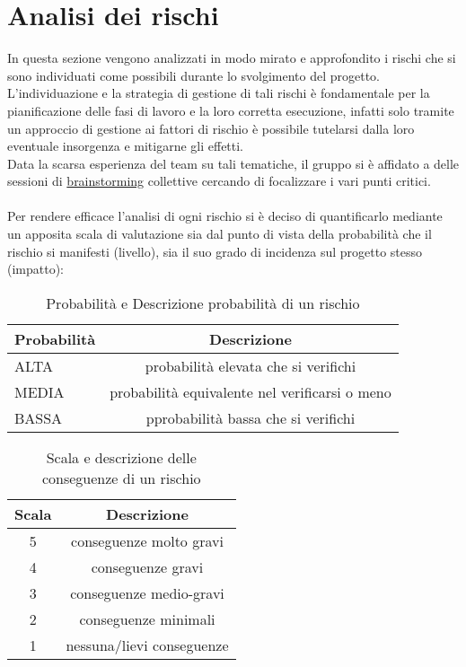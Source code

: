 \section{Analisi dei rischi}
In questa sezione vengono analizzati in modo mirato e approfondito i rischi che si sono individuati come possibili durante lo svolgimento del progetto. L'individuazione e la strategia di gestione di tali rischi è fondamentale per la pianificazione delle fasi di lavoro e la loro corretta esecuzione, infatti solo tramite un approccio di gestione ai fattori di rischio è possibile tutelarsi dalla loro eventuale insorgenza e mitigarne gli effetti.\\
Data la scarsa esperienza del team su tali tematiche, il gruppo si è affidato a delle sessioni di \underline{brainstorming} collettive cercando di focalizzare i vari punti critici. \\\\
Per rendere efficace l'analisi di ogni rischio si è deciso di quantificarlo mediante un apposita scala di valutazione sia dal punto di vista della probabilità che il rischio si manifesti (livello), sia il suo grado di incidenza sul progetto stesso (impatto):\\
\begin{table}[h!]
\centering
\begin{tabular}{|l|c|}
\hline
Probabilità& Descrizione\\
\hline
ALTA & probabilità elevata che si verifichi\\
MEDIA & probabilità equivalente nel verificarsi o meno\\
BASSA & pprobabilità bassa che si verifichi\\
\hline
\end{tabular}
\caption{Probabilità e Descrizione probabilità di un rischio}\label{tab:livellorischi}
\end{table}
\begin{table}[h!]
\centering
\begin{tabular}{|c|c|}
\hline
Scala& Descrizione  \\
\hline
5 & conseguenze molto gravi\\
4 & conseguenze gravi\\
3 & conseguenze medio-gravi\\
2 & conseguenze minimali\\
1 & nessuna/lievi conseguenze\\
\hline
\end{tabular}
\caption{Scala e descrizione delle conseguenze di un rischio}\label{tab:impattorischi}
\end{table}

